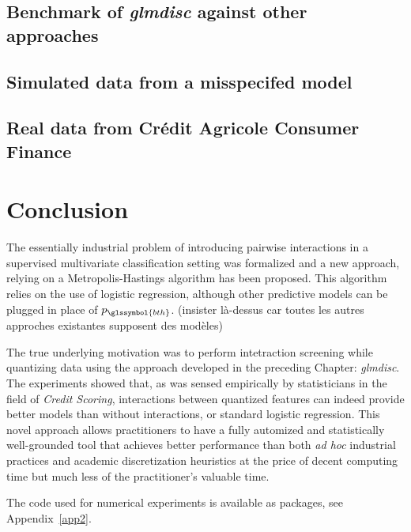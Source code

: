 \subsection{Benchmark of \textit{glmdisc} against other approaches} \label{sec:exp}

\subsection{Simulated data from a misspecifed model}

\subsection{Real data from Crédit Agricole Consumer Finance}

\section{Conclusion} \label{sec:ccl}

The essentially industrial problem of introducing pairwise interactions in a supervised multivariate classification setting was formalized and a new approach, relying on a Metropolis-Hastings algorithm has been proposed. This algorithm relies on the use of logistic regression, although other predictive models can be plugged in place of $p_{\glssymbol{bth}}$. (insister là-dessus car toutes les autres approches existantes supposent des modèles)

The true underlying motivation was to perform intetraction screening while quantizing data using the approach developed in the preceding Chapter: \textit{glmdisc}.
The experiments showed that, as was sensed empirically by statisticians in the field of \textit{Credit Scoring}, interactions between quantized features can indeed provide better models than without interactions, or standard logistic regression. This novel approach allows practitioners to have a fully automized and statistically well-grounded tool that achieves better performance than both \textit{ad hoc} industrial practices and academic discretization heuristics at the price of decent computing time but much less of the practitioner's valuable time.

The code used for numerical experiments is available as packages, see Appendix~\ref{app2}.














\printbibliography[heading=subbibliography, title=References of Chapter 4]
